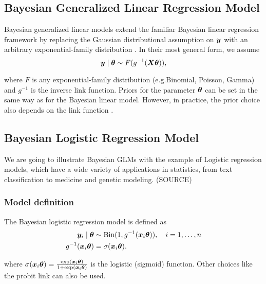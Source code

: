 \subsection{Bayesian Generalized Linear Regression Model}\label{sec:logit-glm}

Bayesian generalized linear models extend the familiar Bayesian linear regression framework by replacing the Gaussian distributional assumption on $\bm{y}$ with an arbitrary exponential-family distribution \citep{nelder_generalized_1972,west_dynamic_1985}. 
In their most general form, we assume
\begin{equation*}
    \bm{y} \mid \bm{\theta} \sim F(g^{-1}(\bm{X} \bm{\theta})),
\end{equation*}

where $F$ is any exponential-family distribution (e.g.\@ Binomial, Poisson, Gamma) and $g^{-1}$ is the inverse link function.
Priors for the parameter $\bm{\theta}$ can be set in the same way as for the Bayesian linear model. However, in practice, the prior choice also depends on the link function \citep{west_dynamic_1985}.

\subsection{Bayesian Logistic Regression Model} \label{sec:logit-logit}

We are going to illustrate Bayesian GLMs with the example of Logistic regression models, which have a wide variety of applications in statistics, from text classification to medicine and genetic modeling. (SOURCE)

\subsubsection*{Model definition}

The Bayesian logistic regression model is defined as
\begin{equation}\label{eq:logit}
    \begin{aligned}
        \bm{y}_i \mid \bm{\theta} &\sim \text{Bin}(1, g^{-1}(\bm{x}_i \bm{\theta})), \quad i = 1, \dots, n \\
        g^{-1}(\bm{x}_i \bm{\theta}) &= \sigma(\bm{x}_i \bm{\theta}).
    \end{aligned}
\end{equation}

where $\sigma(\bm{x}_i \bm{\theta}) = \frac{\exp(\bm{x}_i \bm{\theta})}{1 + \exp(\bm{x}_i \bm{\theta})}$ is the logistic (sigmoid) function.  Other choices like the probit link can also be used.

